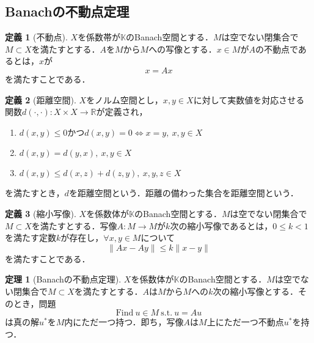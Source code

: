 \documentclass[11pt,a4paper]{jsarticle}
\theoremstyle{definition}
\newtheorem{dfn}{定義}
\newtheorem{thm}{定理}
\begin{document}
\subsection{Banachの不動点定理}
\begin{dfn}[不動点]
  $X$を係数帯が$\mathbb{K}$のBanach空間とする．$M$は空でない閉集合で$M\subset X$を満たすとする．$A$を$M$から$M$への写像とする．$x\in M$が$A$の不動点であるとは，$x$が
  \begin{equation*}
    x=Ax
  \end{equation*}
  を満たすことである．
\end{dfn}

\begin{dfn}[距離空間]
  $X$をノルム空間とし，$x,y\in X$に対して実数値を対応させる関数$d(\cdot,\cdot):X\times X\rightarrow \mathbb{R}$が定義され，
  \begin{enumerate}
    \item $d(x,y) \leq 0$かつ$d(x,y)=0 \Leftrightarrow x=y,\ x,y\in X$
    \item $d(x,y)=d(y,x),\ x,y\in X$
    \item $d(x,y)\leq d(x,z) + d(z,y),\ x,y,z\in X$
  \end{enumerate}
  を満たすとき，$d$を距離空間という．距離の備わった集合を距離空間という．
\end{dfn}

\begin{dfn}[縮小写像]
  $X$を係数体が$\mathbb{K}$のBanach空間とする．$M$は空でない閉集合で$M\subset X$を満たすとする．写像$A:M\rightarrow M$が$k$次の縮小写像であるとは，$0\leq k<1$を満たす定数$k$が存在し，$\forall x,y \in M$について
  \begin{equation*}
    \|Ax-Ay\|\leq k\|x-y\|
  \end{equation*}
  を満たすことである．
\end{dfn}

\begin{thm}[Banachの不動点定理]
  \label{thm:Banachの不動点定理}
  $X$を係数体が$\mathbb{K}$のBanach空間とする．$M$は空でない閉集合で$M\subset X$を満たすとする．$A$は$M$から$M$への$k$次の縮小写像とする．そのとき，問題
  \begin{equation}
    \label{equ:Banachの不動点定理}
    \mathrm{Find}\ u\in M\ \mathrm{s.t.} \ u=Au
  \end{equation}
  は真の解$u^*$を$M$内にただ一つ持つ．即ち，写像$A$は$M$上にただ一つ不動点$u^*$を持つ．
\end{thm}
\end{document}
